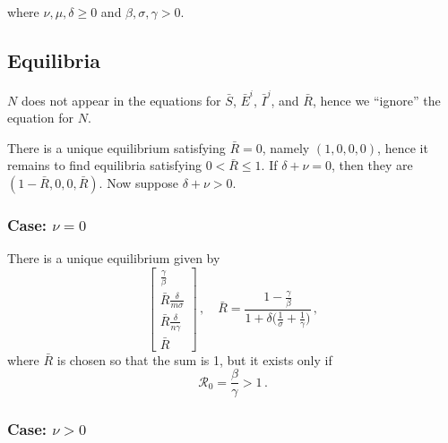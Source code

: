 \documentclass[fleqn]{article}
\begin{document}
where $\nu,\mu,\delta \geq 0$ and $\beta,\sigma,\gamma > 0$.

\subsection{Equilibria}

$N$ does not appear in the equations for $\bar{S}$, $\bar{E}^{i}$,
$\bar{I}^{j}$, and $\bar{R}$, hence we ``ignore'' the equation for $N$.

There is a unique equilibrium satisfying $\bar{R} = 0$, namely
$(1, 0, 0, 0)$, hence it remains to find equilibria satisfying
$0 < \bar{R} \leq 1$.  If $\delta + \nu = 0$, then they are
$(1 - \bar{R}, 0, 0, \bar{R})$.  Now suppose $\delta + \nu > 0$.

\subsubsection{Case: $\nu = 0$}

There is a unique equilibrium given by
\begin{equation}
\begin{bmatrix}
  \frac{\gamma}{\beta} \\
  \bar{R} \frac{\delta}{m \sigma} \\
  \bar{R} \frac{\delta}{n \gamma} \\
  \bar{R}
\end{bmatrix}
\,,\quad
\bar{R} = \frac{1 - \frac{\gamma}{\beta}}{1 + \delta \big(\frac{1}{\sigma} + \frac{1}{\gamma}\big)}\,,
\end{equation}
where $\bar{R}$ is chosen so that the sum is 1, but it exists only if
\begin{equation}
\mathcal{R}_{0} = \frac{\beta}{\gamma} > 1\,.
\end{equation}

\subsubsection{Case: $\nu > 0$}
\end{document}
